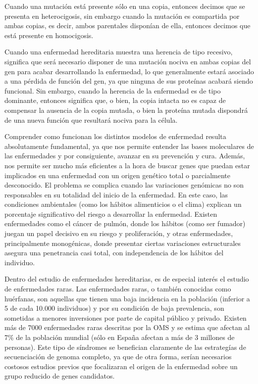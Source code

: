 \medskip
Cuando una mutación está presente sólo en una copia, entonces decimos que se presenta en heterocigosis, sin embargo cuando la mutación es compartida por ambas copias, es decir, ambos parentales disponían de ella, entonces decimos que está presente en homocigosis. 

\medskip
Cuando una enfermedad hereditaria muestra una herencia de tipo recesivo, significa que será necesario disponer de una mutación nociva en ambas copias del gen para acabar desarrollando la enfermedad, lo que generalmente estará asociado a una pérdida de función del gen, ya que ninguna de sus proteínas acabará siendo funcional. Sin embargo, cuando la herencia de la enfermedad es de tipo dominante, entonces significa que, o bien, la copia intacta no es capaz de compensar la ausencia de la copia mutada, o bien la proteína mutada dispondrá de una nueva función que resultará nociva para la célula.  

\medskip
Comprender como funcionan los distintos modelos de enfermedad resulta absolutamente fundamental, ya que nos permite entender las bases moleculares de las enfermedades y por consiguiente, avanzar en su prevención y cura. Además, nos permite ser mucho más eficientes a la hora de buscar genes que puedan estar implicados en una enfermedad con un origen genético total o parcialmente desconocido. El problema se complica cuando las variaciones genómicas no son responsables en su totalidad del inicio de la enfermedad. En este caso, las condiciones ambientales (como los hábitos alimenticios o el clima) explican un porcentaje significativo del riesgo a desarrollar la enfermedad. Existen enfermedades como el cáncer de pulmón, donde los hábitos (como ser fumador) juegan un papel decisivo en su riesgo y proliferación, y otras enfermedades, principalmente monogénicas, donde presentar ciertas variaciones estructurales asegura una penetrancia casi total, con independencia de los hábitos del individuo.

\medskip
Dentro del estudio de enfermedades hereditarias, es de especial interés el estudio de enfermedades raras. Las enfermedades raras, o también conocidas como huérfanas, son aquellas que tienen una baja incidencia en la población (inferior a 5 de cada 10.000 individuos) y por su condición de baja prevalencia, son sometidas a menores inversiones por parte de capital público y privado. Existen más de 7000 enfermedades raras descritas por la OMS y se estima que afectan al 7\% de la población mundial (sólo en España afectan a más de 3 millones de personas). Este tipo de síndromes se benefician claramente de las estrategías de secuenciación de genoma completo, ya que de otra forma, serían necesarios costosos estudios previos que focalizaran el origen de la enfermedad sobre un grupo reducido de genes candidatos.

